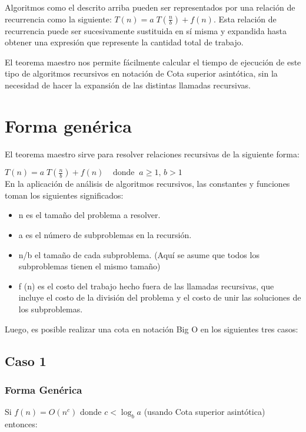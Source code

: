 \documentclass{article} %
\begin{document}
Algoritmos como el descrito arriba pueden ser representados por una relación de recurrencia como la siguiente: 
${\displaystyle T(n)=a\;T\left({\frac {n}{b}}\right)+f(n)}$. Esta relación de recurrencia puede ser sucesivamente sustituida en sí misma y expandida hasta obtener una expresión que represente la cantidad total de trabajo.

El teorema maestro nos permite fácilmente calcular el tiempo de ejecución de este tipo de algoritmos recursivos en notación de Cota superior asintótica, sin la necesidad de hacer la expansión de las distintas llamadas recursivas.
\section{Forma genérica}
El teorema maestro sirve para resolver relaciones recursivas de la siguiente forma:

${\displaystyle T(n)=a\;T\!\left({\frac {n}{b}}\right)+f(n)\;\;\;\;{\mbox{donde}}\;\;a\geq 1{\mbox{, }}b>1}$\\
En la aplicación de análisis de algoritmos recursivos, las constantes y funciones toman los siguientes significados:
\begin{itemize}
    \item n es el tamaño del problema a resolver.
    \item a es el número de subproblemas en la recursión.
    \item n/b el tamaño de cada subproblema. (Aquí se asume que todos los subproblemas tienen el mismo tamaño)
    \item f (n) es el costo del trabajo hecho fuera de las llamadas recursivas, que incluye el costo de la división del problema y el costo de unir las soluciones de los subproblemas.
\end{itemize}

Luego, es posible realizar una cota en notación Big O en los siguientes tres casos:

\subsection{Caso 1}
\subsubsection{Forma Genérica}
Si ${\displaystyle f(n)=O\left(n^{c}\right)}$ donde ${\displaystyle c<\log _{b}a}$ (usando Cota superior asintótica)\\

entonces:\\
\end{document}
